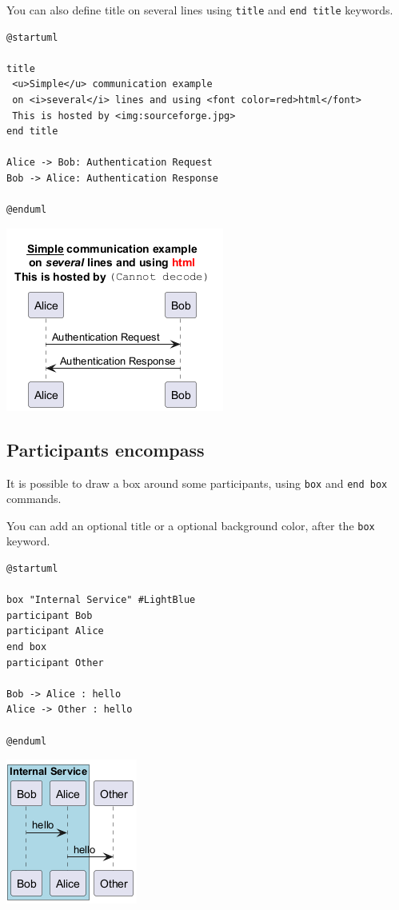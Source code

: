You can also define title on several lines using \texttt{title}
and \texttt{end title} keywords.
\begin{verbatim}
@startuml

title
 <u>Simple</u> communication example
 on <i>several</i> lines and using <font color=red>html</font>
 This is hosted by <img:sourceforge.jpg>
end title

Alice -> Bob: Authentication Request
Bob -> Alice: Authentication Response

@enduml
\end{verbatim}
\begin{center}
\includegraphics[scale=0.60]{imgw/img-bb6bfad36009c3e767dc81565a6282a5.png}
\end{center}


%
%
\subsection{Participants encompass}






It is possible to draw a box around some participants, using \texttt{box}
and \texttt{end box} commands.


You can add an optional title or a
optional background color, after the \texttt{box} keyword.


\begin{verbatim}
@startuml

box "Internal Service" #LightBlue
participant Bob
participant Alice
end box
participant Other

Bob -> Alice : hello
Alice -> Other : hello

@enduml
\end{verbatim}
\begin{center}
\includegraphics[scale=0.60]{imgw/img-01481d782566c715e3d44cdfbba2e73d.png}
\end{center}




